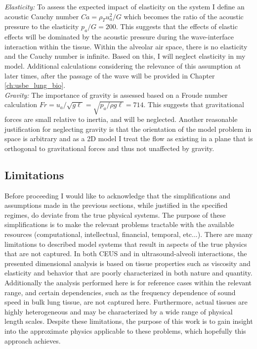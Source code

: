 \noindent\textit{Elasticity:} To assess the expected impact of elasticity on
the system I define an acoustic Cauchy number $Ca = \rho_T u_a^2/G$
which becomes the ratio of the acoustic pressure to the elasticity
$p_a/G = 200$. This suggests that the effects of elastic effects will
be dominated by the acoustic pressure during the wave-interface
interaction within the tissue. Within the alveolar air space, there is
no elasticity and the Cauchy number is infinite. Based on this, I will
neglect elasticity in my model. Additional calculations considering the relevance of this assumption at later times, after the passage of the wave will be provided in Chapter \ref{ch:usbe_lung_bio}.\\

\noindent\textit{Gravity:} The importance of gravity is assessed based on a
Froude number calculation
$Fr= u_a / \sqrt{g \ell} =\sqrt{ p_a/ \rho g \ell} = 714$. This
suggests that gravitational forces are small relative to inertia, and
will be neglected. Another reasonable justification for neglecting
gravity is that the orientation of the model problem in space is
arbitrary and as a 2D model I treat the flow as existing in a plane
that is orthogonal to gravitational forces and thus not unaffected by
gravity.

\subsection{Limitations} 
Before proceeding I would like to acknowledge that the simplifications
and assumptions made in the previous sections, while justified in the
specified regimes, do deviate from the true physical systems. The
purpose of these simplifications is to make the relevant problems
tractable with the available resources (computational, intellectual,
financial, temporal, etc...). There are many limitations to described
model systems that result in aspects of the true physics that are not
captured. In both \ac{CEUS} and in ultrasound-alveoli interactions,
the presented dimensional analysis is based on tissue properties such
as viscosity and elasticity and behavior that are poorly characterized
in both nature and quantity. Additionally the analysis performed here
is for reference cases within the relevant range, and certain
dependencies, such as the frequency dependence of sound speed in bulk
lung tissue, are not captured here. Furthermore, actual tissues are
highly heterogeneous and may be characterized by a wide range of
physical length scales. Despite these limitations, the purpose of this
work is to gain insight into the approximate physics applicable to
these problems, which hopefully this approach achieves.



